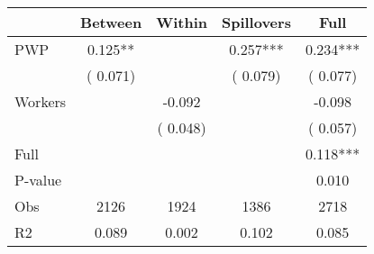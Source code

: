 
\begin{tabular}{l*{4}{c}}\hline&\multicolumn{1}{c}{Between}&\multicolumn{1}{c}{Within}&\multicolumn{1}{c}{Spillovers}&\multicolumn{1}{c}{Full}\\ \hline
 PWP           &              0.125**      &                                               &        0.257*** &         0.234***                            \\ 
                               &        (       0.071)           &                                       &       (       0.079)     &      (       0.077)                                           \\ 
 Workers       &                                               &       -0.092    &                                &            -0.098                            \\ 
                               &                                               & (       0.048)                  &                                        &      (       0.057)                                           \\ 
\hline                                                                                                                                                                                                                                            
 Full                  &                                               &                                               &                                        &             0.118***                                     \\ 
 P-value               &                                               &                                               &                                        &             0.010                                           \\ 
 Obs                   &               2126               &       1924                       &       1386                &              2718                                               \\ 
 R2                    &                      0.089              &              0.002                      &              0.102               &                     0.085                                              \\ 
\hline \end{tabular}                                                                                                                                                                                                              